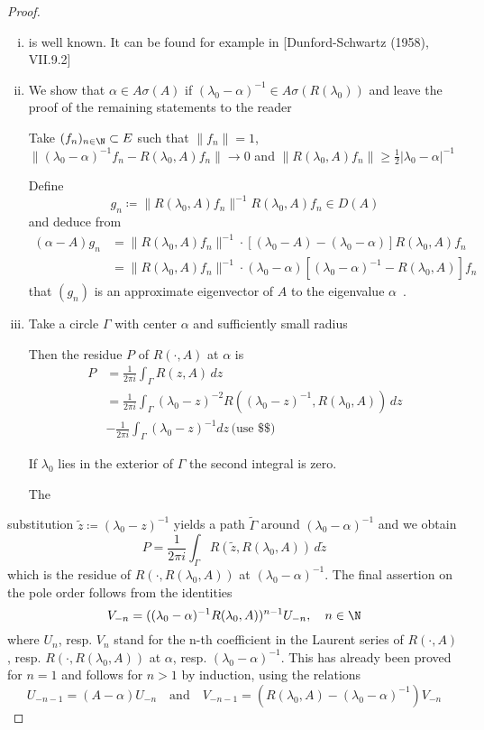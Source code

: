 \begin{proof}
\begin{enumerate}[(i)]
\item is well known. It can be found for example in [Dunford-Schwartz (1958), VII.9.2]

\item We show that $\alpha \in A\sigma(A)$ if $(\lambda_{0}-\alpha)^{-1} \in A\sigma(R(\lambda_{0}))$ and leave the proof of the remaining statements to the reader

Take $(f_{n})_{n \in \N} \subset E$ such that $\|f_{n}\| = 1$, $\|(\lambda_{0}-\alpha)^{-1}f_{n} - R(\lambda_{0},A)f_{n}\| \to 0$ and $\|R(\lambda_{0},A)f_{n}\| \geq \frac{1}{2}|\lambda_{0} - \alpha|^{-1}$

Define
\[
g_{n} \coloneqq \|R(\lambda_{0},A)f_{n}\|^{-1}R(\lambda_{0},A)f_{n} \in D(A)
\]
and deduce from
\begin{align*}
(\alpha-A)g_{n} &= \|R(\lambda_{0},A)f_{n}\|^{-1} \cdot [(\lambda_{0}-A) - (\lambda_{0}-\alpha)]R(\lambda_{0},A)f_{n} \\
&= \|R(\lambda_{0},A)f_{n}\|^{-1} \cdot (\lambda_{0}-\alpha)[(\lambda_{0}-\alpha)^{-1} - R(\lambda_{0},A)]f_{n}
\end{align*}
that $(g_{n})$ is an approximate eigenvector of $A$ to the eigenvalue $\alpha$~.

\item Take a circle $\Gamma$ with center $\alpha$ and sufficiently small radius

Then the residue $P$ of $R(\cdot,A)$ at $\alpha$ is
\begin{align*}
P &= \frac{1}{2\pi i} \int_{\Gamma} R(z,A) \, dz \\
&= \frac{1}{2\pi i} \int_{\Gamma} (\lambda_{0}-z)^{-2}R((\lambda_{0}-z)^{-1},R(\lambda_{0},A)) \, dz \\
&- \frac{1}{2\pi i} \int_{\Gamma}(\lambda_{0}-z)^{-1}dz \, \text{(use \$\$)}
\end{align*}

If $\lambda_{0}$ lies in the exterior of $\Gamma$ the second integral is zero.

The
\end{enumerate}

\newpage
substitution $\tilde{z} \coloneqq (\lambda_{0} - z)^{-1}$ yields a path $\tilde{\Gamma}$ around $(\lambda_{0}-\alpha)^{-1}$ and we obtain
\[
P = \frac{1}{2\pi i} \int_{\Gamma} R(\tilde{z},R(\lambda_{0},A)) \, d\tilde{z}
\]
which is the residue of $R(\cdot,R(\lambda_{0},A))$ at $(\lambda_{0}-\alpha)^{-1}$.
The final assertion on the pole order follows from the identities
\[
V_{-n} = ((\lambda_{0}-\alpha)^{-1}R(\lambda_{0},A))^{n-1}U_{-n}, \quad n \in \N
\]
where $U_{n}$, resp. $V_{n}$ stand for the n-th coefficient in the Laurent series of $R(\cdot,A)$, resp. $R(\cdot,R(\lambda_{0},A))$ at $\alpha$, resp. $(\lambda_{0}-\alpha)^{-1}$.
This has already been proved for $n = 1$ and follows for $n > 1$ by induction, using the relations
\[
U_{-n-1} = (A - \alpha)U_{-n} \quad \text{and} \quad V_{-n-1} = (R(\lambda_{0},A) - (\lambda_{0}-\alpha)^{-1})V_{-n}
\]


\end{proof}
